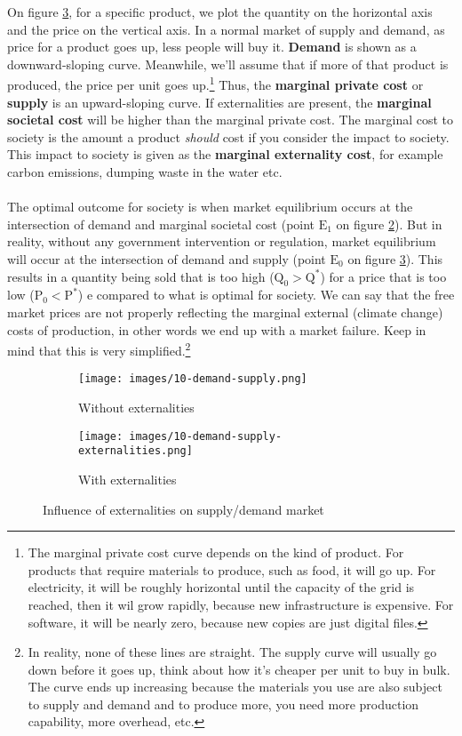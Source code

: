 \documentclass[../summary.tex]{subfiles}
\begin{document}
On figure \ref{fig:influence-externalities}, for a specific product, we plot the quantity on the horizontal axis and the price on the vertical axis. In a normal market of supply and demand, as price for a product goes up, less people will buy it. \textbf{Demand} is shown as a downward-sloping curve. Meanwhile, we'll assume that if more of that product is produced, the price per unit goes up.\footnote{The marginal private cost curve depends on the kind of product. For products that require materials to produce, such as food, it will go up. For electricity, it will be roughly horizontal until the capacity of the grid is reached, then it wil grow rapidly, because new infrastructure is expensive. For software, it will be nearly zero, because new copies are just digital files.} Thus, the \textbf{marginal private cost} or \textbf{supply} is an upward-sloping curve. If externalities are present, the \textbf{marginal societal cost} will be higher than the marginal private cost. The marginal cost to society is the amount a product \textit{should} cost if you consider the impact to society. This impact to society is given as the \textbf{marginal externality cost}, for example carbon emissions, dumping waste in the water etc.
\\\\
The optimal outcome for society is when market equilibrium occurs at the intersection of demand and marginal societal cost (point $\mathrm{E_{1}}$ on figure \ref{fig:demand-supply-externality}).
But in reality, without any government intervention or regulation, market equilibrium will occur at the intersection of demand and supply (point $\mathrm{E_{0}}$ on figure \ref{fig:influence-externalities}). This results in a quantity being sold that is too high ($\mathrm{Q_{0} > Q^{*}}$) for a price that is too low ($\mathrm{P_{0} < P^{*}}$) e compared to what is optimal for society. We can say that the free market prices are not properly reflecting the marginal external (climate change) costs of production, in other words we end up with a market failure. Keep in mind that this is very simplified.\footnote{In reality, none of these lines are straight. The supply curve will usually go down before it goes up, think about how it's cheaper per unit to buy in bulk. The curve ends up increasing because the materials you use are also subject to supply and demand and to produce more, you need more production capability, more overhead, etc.}

\begin{figure}[htbp]
	\centering
	\begin{subfigure}{.5\textwidth}
		\centering
		\texttt{[image: images/10-demand-supply.png]}
		\caption{Without externalities}
		\label{fig:demand-supply}
	\end{subfigure}%
	\begin{subfigure}{.5\textwidth}
		\centering
		\texttt{[image: images/10-demand-supply-externalities.png]}
		\caption{With externalities}
		\label{fig:demand-supply-externality}
	\end{subfigure}
	\caption{Influence of externalities on supply/demand market}
	\label{fig:influence-externalities}
\end{figure}
\end{document}
